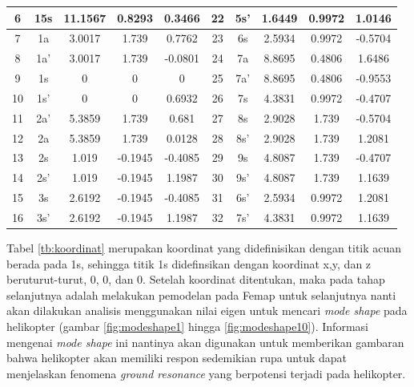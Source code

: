 \begin{table}[h]
{\begin{tabular}{|
				>{\columncolor[HTML]{FFCCC9}}c |
				>{\columncolor[HTML]{FFCE93}}c |ccc|
				>{\columncolor[HTML]{FFCCC9}}c |
				>{\columncolor[HTML]{FFCE93}}c |ccc|}
			6 & 15s & \multicolumn{1}{c|}{11.1567} & \multicolumn{1}{c|}{0.8293} & 0.3466 & 22 & 5s' & \multicolumn{1}{c|}{1.6449} & \multicolumn{1}{c|}{0.9972} & 1.0146 \\ \hline
			7 & 1a & \multicolumn{1}{c|}{3.0017} & \multicolumn{1}{c|}{1.739} & 0.7762 & 23 & 6s & \multicolumn{1}{c|}{2.5934} & \multicolumn{1}{c|}{0.9972} & -0.5704 \\ \hline
			8 & 1a' & \multicolumn{1}{c|}{3.0017} & \multicolumn{1}{c|}{1.739} & -0.0801 & 24 & 7a & \multicolumn{1}{c|}{8.8695} & \multicolumn{1}{c|}{0.4806} & 1.6486 \\ \hline
			9 & 1s & \multicolumn{1}{c|}{0} & \multicolumn{1}{c|}{0} & 0 & 25 & 7a' & \multicolumn{1}{c|}{8.8695} & \multicolumn{1}{c|}{0.4806} & -0.9553 \\ \hline
			10 & 1s' & \multicolumn{1}{c|}{0} & \multicolumn{1}{c|}{0} & 0.6932 & 26 & 7s & \multicolumn{1}{c|}{4.3831} & \multicolumn{1}{c|}{0.9972} & -0.4707 \\ \hline
			11 & 2a' & \multicolumn{1}{c|}{5.3859} & \multicolumn{1}{c|}{1.739} & 0.681 & 27 & 8s & \multicolumn{1}{c|}{2.9028} & \multicolumn{1}{c|}{1.739} & -0.5704 \\ \hline
			12 & 2a & \multicolumn{1}{c|}{5.3859} & \multicolumn{1}{c|}{1.739} & 0.0128 & 28 & 8s' & \multicolumn{1}{c|}{2.9028} & \multicolumn{1}{c|}{1.739} & 1.2081 \\ \hline
			13 & 2s & \multicolumn{1}{c|}{1.019} & \multicolumn{1}{c|}{-0.1945} & -0.4085 & 29 & 9s & \multicolumn{1}{c|}{4.8087} & \multicolumn{1}{c|}{1.739} & -0.4707 \\ \hline
			14 & 2s' & \multicolumn{1}{c|}{1.019} & \multicolumn{1}{c|}{-0.1945} & 1.1987 & 30 & 9s' & \multicolumn{1}{c|}{4.8087} & \multicolumn{1}{c|}{1.739} & 1.1639 \\ \hline
			15 & 3s & \multicolumn{1}{c|}{2.6192} & \multicolumn{1}{c|}{-0.1945} & -0.4085 & 31 & 6s' & \multicolumn{1}{c|}{2.5934} & \multicolumn{1}{c|}{0.9972} & 1.2081 \\ \hline
			16 & 3s' & \multicolumn{1}{c|}{2.6192} & \multicolumn{1}{c|}{-0.1945} & 1.1987 & 32 & 7s' & \multicolumn{1}{c|}{4.3831} & \multicolumn{1}{c|}{0.9972} & 1.1639 \\ \hline
		\end{tabular}%
	}
\end{table}

Tabel \ref{tb:koordinat} merupakan koordinat yang didefinisikan dengan titik acuan berada pada 1s, sehingga titik 1s didefinsikan dengan koordinat x,y, dan z beruturut-turut, 0, 0, dan 0. Setelah koordinat ditentukan, maka pada tahap selanjutnya adalah melakukan pemodelan pada Femap untuk selanjutnya nanti akan dilakukan analisis menggunakan nilai eigen untuk mencari \textit{mode shape} pada helikopter (gambar \ref{fig:modeshape1} hingga \ref{fig:modeshape10}). Informasi mengenai \textit{mode shape} ini nantinya akan digunakan untuk memberikan gambaran bahwa helikopter akan memiliki respon sedemikian rupa untuk dapat menjelaskan fenomena \textit{ground resonance} yang berpotensi terjadi pada helikopter.